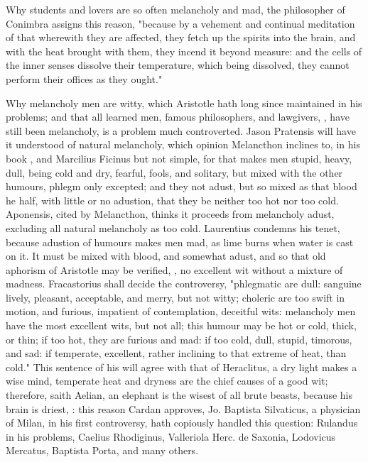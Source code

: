 {Why students and lovers are so often melancholy and mad, the philosopher of
Conimbra assigns this reason, "because by a vehement and
continual meditation of that wherewith they are affected, they fetch up the
spirits into the brain, and with the heat brought with them, they incend it
beyond measure: and the cells of the inner senses dissolve their temperature,
which being dissolved, they cannot perform their offices as they ought."

Why melancholy men are witty, which Aristotle hath long since maintained in his
problems; and that all learned men, famous philosophers,
and lawgivers, , have still been
melancholy, is a problem much controverted. Jason Pratensis will have it
understood of natural melancholy, which opinion Melancthon inclines to, in his
book , and Marcilius Ficinus
 but not simple, for that
makes men stupid, heavy, dull, being cold and dry, fearful, fools, and
solitary, but mixed with the other humours, phlegm only excepted; and they not
adust, but so mixed as that blood he half, with little or
no adustion, that they be neither too hot nor too cold. Aponensis, cited by
Melancthon, thinks it proceeds from melancholy adust, excluding all natural
melancholy as too cold. Laurentius condemns his tenet, because adustion of
humours makes men mad, as lime burns when water is cast on it. It must be mixed
with blood, and somewhat adust, and so that old aphorism of Aristotle may be
verified, , no excellent wit
without a mixture of madness. Fracastorius shall decide the controversy,
"phlegmatic are dull: sanguine lively, pleasant,
acceptable, and merry, but not witty; choleric are too swift in motion, and
furious, impatient of contemplation, deceitful wits: melancholy men have the
most excellent wits, but not all; this humour may be hot or cold, thick, or
thin; if too hot, they are furious and mad: if too cold, dull, stupid,
timorous, and sad: if temperate, excellent, rather inclining to that extreme of
heat, than cold." This sentence of his will agree with that of Heraclitus, a
dry light makes a wise mind, temperate heat and dryness are the chief causes of
a good wit; therefore, saith Aelian, an elephant is the wisest of all brute
beasts, because his brain is driest, : this
reason Cardan approves,  Jo. Baptista
Silvaticus, a physician of Milan, in his first controversy, hath copiously
handled this question: Rulandus in his problems, Caelius Rhodiginus,
 Valleriola  Herc. de Saxonia, 
Lodovicus Mercatus, 
Baptista Porta,  and many others.

}
